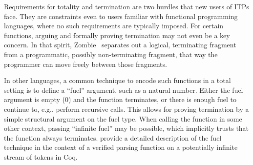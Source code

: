 Requirements for totality and termination are two hurdles that new users of ITPs face. They are constraints even to users familiar with functional programming languages, where no such requirements are typically imposed. For certain functions, arguing and formally proving termination may not even be a key concern. 
In that spirit, Zombie~\citep{Casinghino2014} separates out a logical, terminating fragment from a programmatic,
possibly non-terminating fragment, that way the programmer can move freely between those fragments.

In other languages, a common technique to encode such functions in a total setting is to define a ``fuel'' argument, such as a natural number. Either the fuel argument is empty (0) and the function terminates, or there is enough fuel to continue to, e.g., perform recursive calls. This allows 
for proving termination by a simple structural argument on the fuel type. When calling the function in some other context, passing ``infinite fuel'' may be possible, which implicitly trusts that the function always terminates. \cite{Jourdan2012} provide a detailed description of the fuel technique in the context of a verified parsing function on a potentially infinite stream of tokens in Coq.





